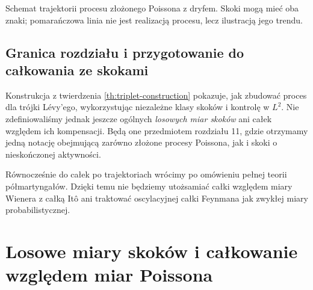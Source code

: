 \documentclass[11pt,a4paper,oneside]{report}
\numberwithin{equation}{chapter}
\theoremstyle{plain}
\theoremstyle{definition}
\theoremstyle{remark}
\begin{document}
\begin{center}
\par\smallskip\small Schemat trajektorii procesu złożonego Poissona
z dryfem. Skoki mogą mieć oba znaki; pomarańczowa linia
nie jest realizacją procesu, lecz ilustracją jego trendu.
\end{center}

\section{Granica rozdziału i przygotowanie do całkowania ze skokami}\label{sec:volIII:10:10}
Konstrukcja z twierdzenia \ref{th:triplet-construction}
pokazuje, jak zbudować proces dla trójki Lévy'ego,
wykorzystując niezależne klasy skoków i kontrolę w $L^2$.
Nie zdefiniowaliśmy jednak jeszcze ogólnych \emph{losowych
miar skoków} ani całek względem ich kompensacji.
Będą one przedmiotem rozdziału 11, gdzie otrzymamy
jedną notację obejmującą zarówno złożone procesy Poissona,
jak i skoki o nieskończonej aktywności.

Równocześnie do całek po trajektoriach wrócimy po omówieniu
pełnej teorii półmartyngałów. Dzięki temu nie będziemy
utożsamiać całki względem miary Wienera z całką Itô
ani traktować oscylacyjnej całki Feynmana jak zwykłej
miary probabilistycznej.

\chapter{Losowe miary skoków i całkowanie względem miar Poissona}
\label{chap:volIII:11}
\par\smallskip{}\par\smallskip
\end{document}

